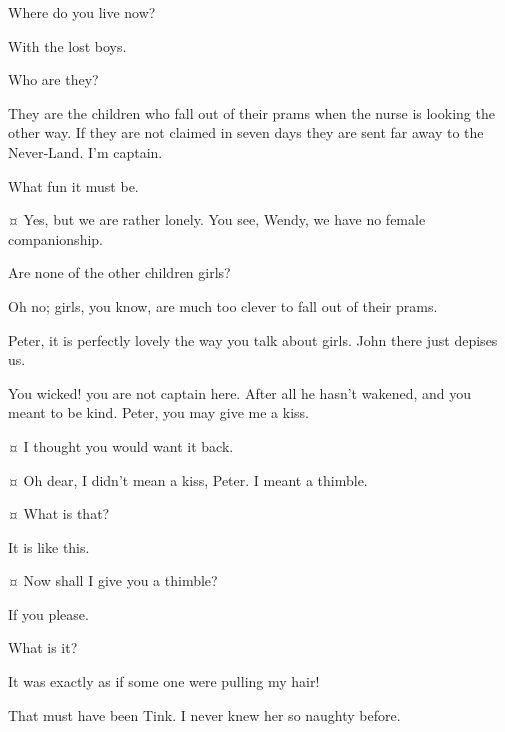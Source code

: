 \begin{drama}
\wendyspeaks
Where do you live now?

\peterspeaks
With the lost boys.

\wendyspeaks
Who are they?

\peterspeaks
They are the children who fall out of their prams when the nurse is looking the other way.
If they are not claimed in seven days they are sent far away to the Never‐Land.
I’m captain.

\wendyspeaks
What fun it must be.

\peterspeaks {}¤
Yes, but we are rather lonely.
You see, Wendy, we have no female companionship.

\wendyspeaks
Are none of the other children girls?

\peterspeaks
Oh no; girls, you know, are much too clever to fall out of their prams.

\wendyspeaks
Peter, it is perfectly lovely the way you talk about girls.
John there just depises us.


\speakercontinues
You wicked!
you are not captain here.
After all he hasn’t wakened, and you meant to be kind.
Peter, you may give me a kiss.

\peterspeaks {}¤
I thought you would want it back.

\wendyspeaks {}¤
Oh dear, I didn’t mean a kiss, Peter.
I meant a thimble.

\peterspeaks {}¤
What is that?

\wendyspeaks
It is like this.

\peterspeaks {}¤
Now shall I give you a thimble?

\wendyspeaks
If you please.

\peterspeaks
What is it?

\wendyspeaks
It was exactly as if some one were pulling my hair!

\peterspeaks
That must have been Tink.
I never knew her so naughty before.



\end{drama}

